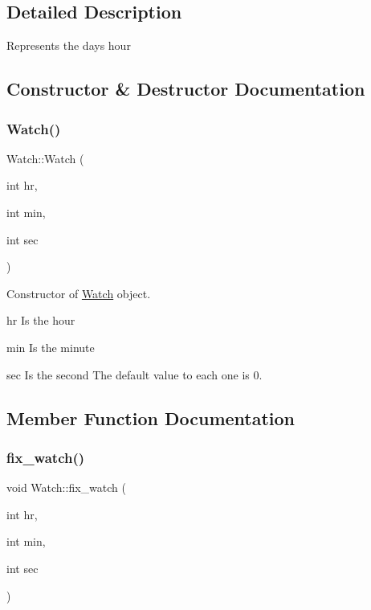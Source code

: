 \subsection{Detailed Description}
Represents the day\textquotesingle{}s hour 

\subsection{Constructor \& Destructor Documentation}
\mbox{\label{classWatch_af94b86136289f216efc480468318c432}} 
\subsubsection{\texorpdfstring{Watch()}{Watch()}}
{\footnotesize\ttfamily Watch\+::\+Watch (\begin{DoxyParamCaption}\item[{int}]{hr,  }\item[{int}]{min,  }\item[{int}]{sec }\end{DoxyParamCaption})\hspace{0.3cm}{\ttfamily [inline]}}

Constructor of \mbox{\hyperlink{classWatch}{Watch}} object. \begin{DoxyItemize}
\item hr Is the hour \item min Is the minute \item sec Is the second The default value to each one is 0. \end{DoxyItemize}


\subsection{Member Function Documentation}
\mbox{\label{classWatch_aa798aede56936dbc09f1e64219c65016}} 
\subsubsection{\texorpdfstring{fix\+\_\+watch()}{fix\_watch()}}
{\footnotesize\ttfamily void Watch\+::fix\+\_\+watch (\begin{DoxyParamCaption}\item[{int}]{hr,  }\item[{int}]{min,  }\item[{int}]{sec }\end{DoxyParamCaption})}

